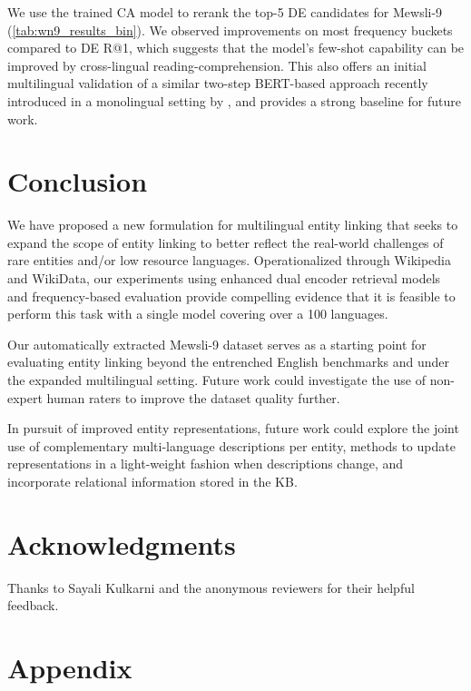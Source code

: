 \documentclass[11pt,a4paper]{article}
\begin{document}
We use the trained CA model to rerank the \mbox{top-5} DE candidates for Mewsli-9 (\autoref{tab:wn9_results_bin}). We observed improvements on most frequency buckets compared to DE R@1, which suggests that the model's few-shot capability can be improved by cross-lingual reading-comprehension.
This also offers an initial multilingual validation of a similar two-step BERT-based approach recently introduced in a monolingual setting by
\citep{wu2019zeroshot}, and provides a strong baseline for future work.


\section{Conclusion}
We have proposed a new formulation for multilingual entity linking that seeks to expand the scope of entity linking to better reflect the real-world challenges
of rare entities and/or low resource languages.
Operationalized through Wikipedia and WikiData, our experiments using enhanced dual encoder retrieval models and frequency-based evaluation provide compelling evidence that it is feasible to perform this task with a single model covering over a 100 languages.

Our automatically extracted Mewsli-9 dataset serves as a starting point for evaluating entity linking beyond the entrenched English benchmarks and under the expanded multilingual setting.
Future work could investigate the use of non-expert human raters to improve the dataset quality further.

In pursuit of improved entity representations, future work could explore the joint use of complementary multi-language descriptions per entity, methods to update representations in a light-weight fashion when descriptions change, and incorporate relational information stored in the KB.

\section*{Acknowledgments}
Thanks to Sayali Kulkarni and the anonymous reviewers for their helpful feedback.





\appendix

\clearpage

\renewcommand{\thesubsection}{\Alph{subsection}}
\section*{Appendix}
\end{document}
